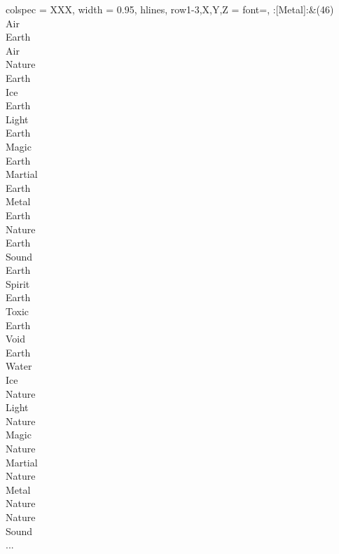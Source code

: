 \begin{longtblr}[
	caption = {2v1 Defending Weak},
	label = {2v1-Defending-Weak},
]{
	colspec = {XXX}, width = 0.95\linewidth,
	hlines,
	row{1-3,X,Y,Z} = {font=\bfseries},
}
	:[Metal]:&{(46)\\
	Air \\
	Earth \\
	Air \\
	Nature \\
	Earth \\
	Ice \\
	Earth \\
	Light \\
	Earth \\
	Magic \\
	Earth \\
	Martial \\
	Earth \\
	Metal \\
	Earth \\
	Nature \\
	Earth \\
	Sound \\
	Earth \\
	Spirit \\
	Earth \\
	Toxic \\
	Earth \\
	Void \\
	Earth \\
	Water \\
	Ice \\
	Nature \\
	Light \\
	Nature \\
	Magic \\
	Nature \\
	Martial \\
	Nature \\
	Metal \\
	Nature \\
	Nature \\
	Sound \\
	...\\
	}\\


\end{longtblr}
